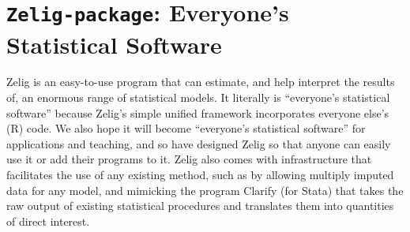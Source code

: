  \section{{\tt Zelig-package}: Everyone's Statistical Software}\label{ss:Zelig.Rdash.package}
\begin{Description}\relax
Zelig is an easy-to-use program that can estimate, and
help interpret the results of, an enormous range of statistical
models. It literally is ``everyone's statistical software''
because Zelig's simple unified framework incorporates everyone
else's (R) code. We also hope it will become ``everyone's
statistical software'' for applications and teaching, and so
have designed Zelig so that anyone can easily use it or add
their programs to it.  Zelig also comes with infrastructure
that facilitates the use of any existing method, such as by
allowing multiply imputed data for any model, and mimicking the
program Clarify (for Stata) that takes the raw output of
existing statistical procedures and translates them into
quantities of direct interest.
\end{Description}
